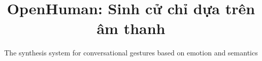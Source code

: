 \documentclass[10pt,mathserif]{beamer}
\title{\large \bfseries OpenHuman: Sinh cử chỉ dựa trên âm thanh}
\subtitle{The synthesis system for conversational gestures based on emotion and semantics}
\begin{document}
\begin{frame}[plain]
	\titlepage
\end{frame}










%


%
%

%

%



\end{document}
